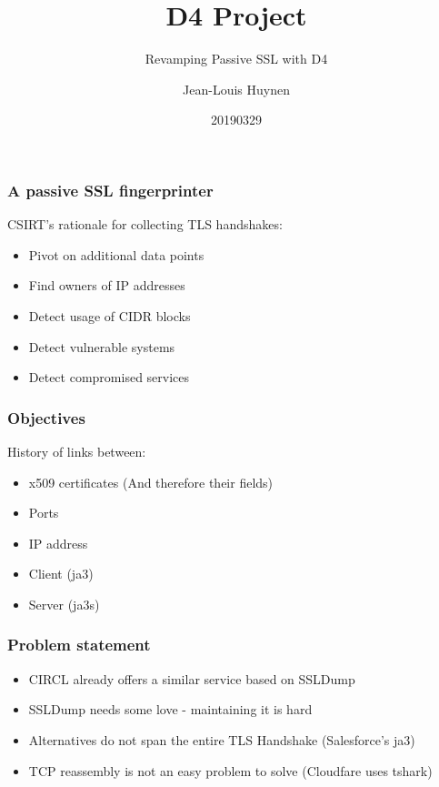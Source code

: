 \documentclass{beamer}
\title{D4 Project}
\subtitle{Revamping Passive SSL with D4}
\author{Jean-Louis Huynen}
\institute{Team CIRCL \\ \url{https://www.d4-project.org/}}
\date{20190329}
\begin{document}
\begin{frame}
    \maketitle
\end{frame}
       
\begin{frame}
        \frametitle{A passive SSL fingerprinter}
        CSIRT's rationale for collecting TLS handshakes:
        \begin{itemize}
          \item Pivot on additional data points
          \item Find owners of IP addresses
          \item Detect usage of CIDR blocks
          \item Detect vulnerable systems
          \item Detect compromised services
        \end{itemize}
\end{frame}

\begin{frame}
  \frametitle{Objectives}

        History of links between:
        \begin{itemize}
          \item x509 certificates (And therefore their fields) 
          \item Ports
          \item IP address
          \item Client (ja3)
          \item Server (ja3s)
        \end{itemize}
\end{frame}
 
\begin{frame}
        \frametitle{Problem statement}
        \begin{itemize}
          \item CIRCL already offers a similar service based on SSLDump
          \item SSLDump needs some love - maintaining it is hard
          \item Alternatives do not span the entire TLS Handshake (Salesforce's ja3)
          \item TCP reassembly is not an easy problem to solve (Cloudfare uses tshark)
        \end{itemize}
\end{frame}
\end{document}
